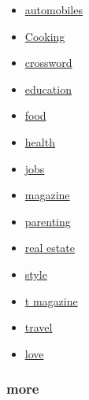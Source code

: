 \begin{itemize}
\tightlist
\item
  \href{https://www.nytimes.com/section/automobiles}{automobiles}
\item
  \href{https://cooking.nytimes.com/}{Cooking}
\item
  \href{https://www.nytimes.com/crosswords}{crossword}
\item
  \href{https://www.nytimes.com/section/education}{education}
\item
  \href{https://www.nytimes.com/section/food}{food}
\item
  \href{https://www.nytimes.com/section/health}{health}
\item
  \href{https://www.nytimes.com/section/jobs}{jobs}
\item
  \href{https://www.nytimes.com/section/magazine}{magazine}
\item
  \href{https://parenting.nytimes.com/}{parenting}
\item
  \href{https://www.nytimes.com/section/realestate}{real estate}
\item
  \href{https://www.nytimes.com/section/style}{style}
\item
  \href{https://www.nytimes.com/section/t-magazine}{t magazine}
\item
  \href{https://www.nytimes.com/section/travel}{travel}
\item
  \href{https://www.nytimes.com/section/fashion/weddings}{love}
\end{itemize}

\hypertarget{more}{%
\subsubsection{more}\label{more}}

